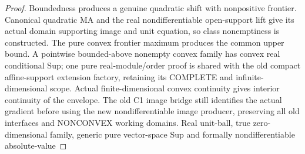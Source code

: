 \begin{proof}
  \leanok
  Boundedness produces a genuine quadratic shift with nonpositive frontier.
  Canonical quadratic MA and the real nondifferentiable open-support lift
  give its actual domain supporting image and unit equation, so class
  nonemptiness is constructed. The pure convex frontier maximum produces
  the common upper bound. A pointwise bounded-above nonempty convex family
  has convex real conditional Sup; one pure real-module/order proof is
  shared with the old compact affine-support extension factory, retaining
  its COMPLETE and infinite-dimensional scope. Actual finite-dimensional
  convex continuity gives interior continuity of the envelope. The old C1
  image bridge still identifies the actual gradient before using the new
  nondifferentiable image producer, preserving all old interfaces and
  NONCONVEX working domains. Real unit-ball, true zero-dimensional family,
  generic pure vector-space Sup and formally nondifferentiable absolute-value

\end{proof}
